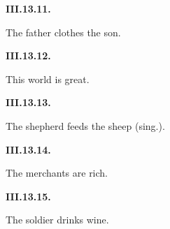 \par\begin{minipage}{\linewidth}\raggedright
\textbf{III.13.11.}

The father clothes the son.

\end{minipage}\par\addvspace{4pt}

\par\begin{minipage}{\linewidth}\raggedright
\textbf{III.13.12.}

This world is great.

\end{minipage}\par\addvspace{4pt}

\par\begin{minipage}{\linewidth}\raggedright
\textbf{III.13.13.}

The shepherd feeds the sheep (sing.).

\end{minipage}\par\addvspace{4pt}

\par\begin{minipage}{\linewidth}\raggedright
\textbf{III.13.14.}

The merchants are rich.

\end{minipage}\par\addvspace{4pt}

\par\begin{minipage}{\linewidth}\raggedright
\textbf{III.13.15.}

The soldier drinks wine.

\end{minipage}\par\addvspace{4pt}

